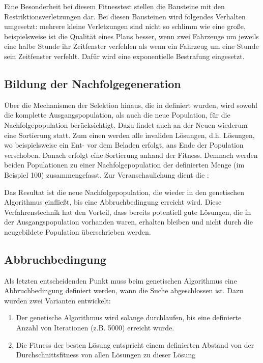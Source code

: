 Eine Besonderheit bei diesem Fitnesstest stellen die Bausteine mit den Restriktionsverletzungen dar. Bei diesen Bausteinen wird folgendes Verhalten umgesetzt: mehrere kleine Verletzungen sind nicht so schlimm wie eine große, beispielsweise ist die Qualität eines Plans besser, wenn zwei Fahrzeuge um jeweils eine halbe Stunde ihr Zeitfenster verfehlen als wenn ein Fahrzeug um eine Stunde sein Zeitfenster verfehlt. Dafür wird eine exponentielle Bestrafung eingesetzt.

\subsection{Bildung der Nachfolgegeneration}
\label{sec:Nachfolgegeneration}
Über die Mechanismen der Selektion hinaus, die in  definiert wurden, wird sowohl die komplette Ausgangspopulation, als auch die neue Population, für die Nachfolgepopulation berücksichtigt. Dazu findet auch an der Neuen wiederum eine Sortierung statt. Zum einen werden alle invaliden Lösungen, d.h. Lösungen, wo beispielsweise ein Ent- vor dem Beladen erfolgt, ans Ende der Population verschoben. Danach erfolgt eine Sortierung anhand der Fitness. Demnach werden beiden Populationen zu einer Nachfolgepopulation der definierten Menge (im Beispiel 100) zusammengefasst. Zur Veranschaulichung dient die :


Das Resultat ist die neue Nachfolgepopulation, die wieder in den genetischen Algorithmus einfließt, bis eine Abbruchbedingung erreicht wird. Diese Verfahrenstechnik hat den Vorteil, dass bereits potentiell gute Lösungen, die in der Ausgangspopulation vorhanden waren, erhalten bleiben und nicht durch die neugebildete Population überschrieben werden.

\FloatBarrier
\subsection{Abbruchbedingung}
Als letzten entscheidenden Punkt muss beim genetischen Algorithmus eine Abbruchbedingung definiert werden, wann die Suche abgeschlossen ist. Dazu wurden zwei Varianten entwickelt:

\begin{enumerate}
 \item Der genetische Algorithmus wird solange durchlaufen, bis eine definierte Anzahl von Iterationen (z.B. 5000) erreicht wurde.
 \item Die Fitness der besten Lösung entspricht einem definierten Abstand von der Durchschnittsfitness von allen Lösungen zu dieser Lösung
\end{enumerate}

